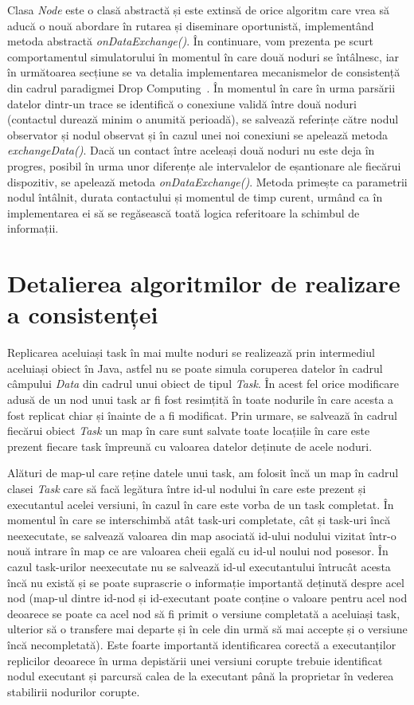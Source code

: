 \documentclass[12pt,a4paper]{report}
\begin{document}
Clasa \textit{Node} este o clasă abstractă și este extinsă de orice algoritm care vrea să aducă o nouă abordare în rutarea și diseminare oportunistă, implementând metoda abstractă \textit{onDataExchange()}. În continuare, vom prezenta pe scurt comportamentul simulatorului în momentul în care două noduri se întâlnesc, iar în următoarea secțiune se va detalia implementarea mecanismelor de consistență din cadrul paradigmei Drop Computing~\cite{DC}. În momentul în care în urma parsării datelor dintr-un trace se identifică o conexiune validă între două noduri (contactul durează minim o anumită perioadă), se salvează referințe către nodul observator și nodul observat și în cazul unei noi conexiuni se apelează metoda \textit{exchangeData()}. Dacă un contact între aceleași două noduri nu este deja în progres, posibil în urma unor diferențe ale intervalelor de eșantionare ale fiecărui dispozitiv, se apelează metoda \textit{onDataExchange()}. Metoda primește ca parametrii nodul întâlnit, durata contactului și momentul de timp curent, urmând ca în implementarea ei să se regăsească toată logica referitoare la schimbul de informații. 

\section{Detalierea algoritmilor de realizare a consistenței}  \label{algoritmi}
Replicarea aceluiași task în mai multe noduri se realizează prin intermediul aceluiași obiect în Java, astfel nu se poate simula coruperea datelor în cadrul câmpului \textit{Data} din cadrul unui obiect de tipul \textit{Task}. În acest fel orice modificare adusă de un nod unui task ar fi fost resimțită în toate nodurile în care acesta a fost replicat chiar și înainte de a fi modificat. Prin urmare, se salvează în cadrul fiecărui obiect \textit{Task} un map în care sunt salvate toate locațiile în care este prezent fiecare task împreună cu valoarea datelor deținute de acele noduri.

Alături de map-ul care reține datele unui task, am folosit încă un map în cadrul clasei \textit{Task} care să facă legătura între id-ul nodului în care este prezent și executantul acelei versiuni, în cazul în care este vorba de un task completat. În momentul în care se interschimbă atât task-uri completate, cât și task-uri încă neexecutate, se salvează valoarea din map asociată id-ului nodului vizitat într-o nouă intrare în map ce are valoarea cheii egală cu id-ul noului nod posesor. În cazul task-urilor neexecutate nu se salvează id-ul executantului întrucât acesta încă nu există și se poate suprascrie o informație importantă deținută despre acel nod (map-ul dintre id-nod și id-executant poate conține o valoare pentru acel nod deoarece se poate ca acel nod să fi primit o versiune completată a aceluiași task, ulterior să o transfere mai departe și în cele din urmă să mai accepte și o versiune încă necompletată). Este foarte importantă identificarea corectă a executanților replicilor deoarece în urma depistării unei versiuni corupte trebuie identificat nodul executant și parcursă calea de la executant până la proprietar în vederea stabilirii nodurilor corupte. 
\end{document}
